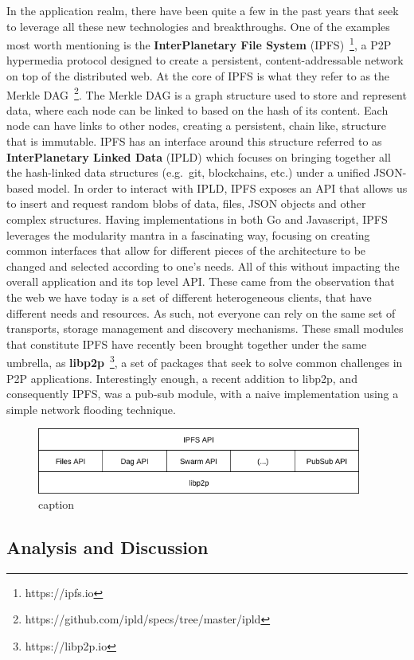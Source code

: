 In the application realm, there have been quite a few in the past years
that seek to leverage all these new technologies and breakthroughs. One
of the examples most worth mentioning is the \textbf{InterPlanetary File
System} (IPFS)~\footnote{https://ipfs.io}, a P2P hypermedia protocol designed
to create a persistent, content-addressable network on top of the
distributed web. At the core of IPFS is what they refer to as the Merkle
DAG~\footnote{https://github.com/ipld/specs/tree/master/ipld}. The Merkle DAG is a
graph structure used to store and represent data, where each node can be
linked to based on the hash of its content. Each node can have links to
other nodes, creating a persistent, chain like, structure that is
immutable. IPFS has an interface around this structure referred to as
\textbf{InterPlanetary Linked Data} (IPLD)
which focuses on bringing together all the hash-linked data structures
(e.g.~git, blockchains, etc.) under a unified JSON-based model. In order
to interact with IPLD, IPFS exposes an API that allows us to insert and
request random blobs of data, files, JSON objects and other complex
structures. Having implementations in both Go and
Javascript, IPFS leverages the modularity mantra in a fascinating way,
focusing on creating common interfaces that allow for different pieces
of the architecture to be changed and selected according to one's needs.
All of this without impacting the overall application and its top level
API. These came from the observation that the web we have today is a set
of different heterogeneous clients, that have different needs and
resources. As such, not everyone can rely on the same set of transports,
storage management and discovery mechanisms. These small modules that
constitute IPFS have recently been brought together under the same
umbrella, as \textbf{libp2p}~\footnote{https://libp2p.io}, a set of
packages that seek to solve common challenges in P2P applications.
Interestingly enough, a recent addition to libp2p, and consequently
IPFS, was a pub-sub module, with a naive implementation using a simple
network flooding technique.

\begin{figure}[hb!]
  \centering
  \includegraphics[width=0.95\textwidth]{img/ipfs-stack.png}
  \caption{caption}
  \label{fig:ipfs-stack}
\end{figure}

\subsection{Analysis and Discussion}\label{analysis-and-discussion}
